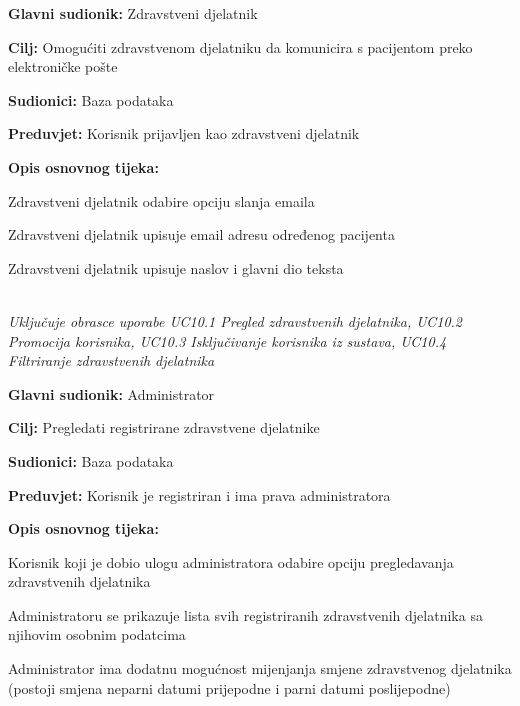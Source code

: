 \noindent {}
\begin{packed_item}
	
	\item \textbf{Glavni sudionik: }Zdravstveni djelatnik
	\item  \textbf{Cilj:} Omogućiti zdravstvenom djelatniku da komunicira s pacijentom preko elektroničke pošte
	\item  \textbf{Sudionici:} Baza podataka
	\item  \textbf{Preduvjet:} Korisnik prijavljen kao zdravstveni djelatnik
	\item  \textbf{Opis osnovnog tijeka:}
	
	\item[] \begin{packed_enum}
		
		\item Zdravstveni djelatnik odabire opciju slanja emaila
		\item Zdravstveni djelatnik upisuje email adresu određenog pacijenta
		\item Zdravstveni djelatnik upisuje naslov i glavni dio teksta
	\end{packed_enum}
	
\end{packed_item}

\noindent {}\\
\textit{Uključuje obrasce uporabe UC10.1 Pregled zdravstvenih djelatnika, UC10.2 Promocija korisnika, UC10.3 Isključivanje korisnika iz sustava, UC10.4 Filtriranje zdravstvenih djelatnika}\\

\noindent {}
\begin{packed_item}
	
	\item \textbf{Glavni sudionik: }Administrator
	\item  \textbf{Cilj:} Pregledati registrirane zdravstvene djelatnike
	\item  \textbf{Sudionici:} Baza podataka
	\item  \textbf{Preduvjet:} Korisnik je registriran i ima prava administratora
	\item  \textbf{Opis osnovnog tijeka:}
	
	\item[] \begin{packed_enum}
		
		\item Korisnik koji je dobio ulogu administratora odabire opciju pregledavanja zdravstvenih djelatnika
		\item Administratoru se prikazuje lista svih registriranih zdravstvenih djelatnika sa njihovim osobnim podatcima
		\item Administrator ima dodatnu mogućnost mijenjanja smjene zdravstvenog djelatnika (postoji smjena neparni datumi prijepodne i parni datumi poslijepodne)
	\end{packed_enum}
	
\end{packed_item}

